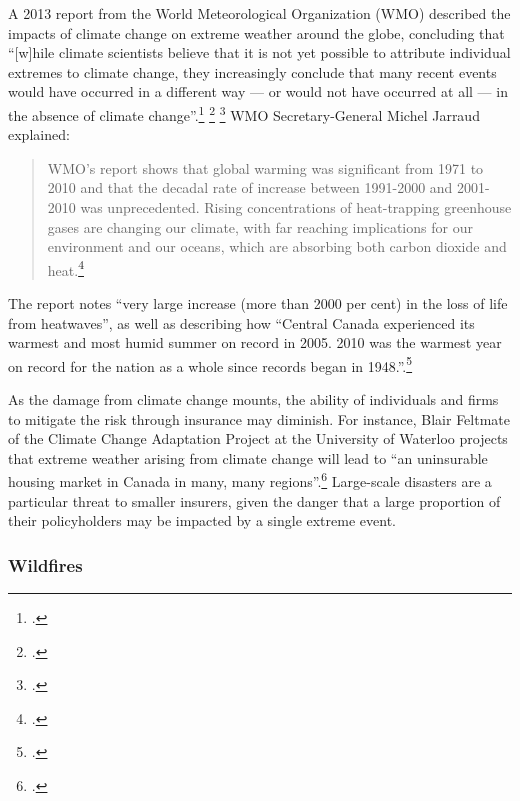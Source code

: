 A 2013 report from the World Meteorological Organization (WMO) described the impacts of climate change on extreme weather around the globe, concluding that ``[w]hile climate scientists believe that it is not yet possible to attribute individual extremes to climate change, they increasingly conclude that many recent events would have occurred in a different way --- or would not have occurred at all --- in the absence of climate change''.\footcite[][p. 15]{WMOExtremesReport} \footcite[See also: ][]{BBConWMO} \footcite[][]{ReutersonWMO}
WMO Secretary-General Michel Jarraud explained:
\begin{quote}
WMO's report shows that global warming was significant from 1971 to 2010 and that the decadal rate of increase between 1991-2000 and 2001-2010 was unprecedented.  Rising concentrations of heat-trapping greenhouse gases are changing our climate, with far reaching implications for our environment and our oceans, which are absorbing both carbon dioxide and heat.\footcite[][]{WMOExtremesPR}
\end{quote}
The report notes ``very large increase (more than 2000 per cent) in the loss of life from heatwaves'', as well as describing how ``Central Canada experienced its warmest and most humid summer on record in 2005. 2010 was the warmest year on record for the nation as a whole since records began in 1948.''.\footcite[][p. 6, 8]{WMOExtremesReport}



As the damage from climate change mounts, the ability of individuals and firms to mitigate the risk through insurance may diminish.
For instance, Blair Feltmate of the Climate Change Adaptation Project at the University of Waterloo projects that extreme weather arising from climate change will lead to ``an uninsurable housing market in Canada in many, many regions''.\footcite[][]{GMUninsurable}
Large-scale disasters are a particular threat to smaller insurers, given the danger that a large proportion of their policyholders may be impacted by a single extreme event.



	\subsubsection{Wildfires}
	


